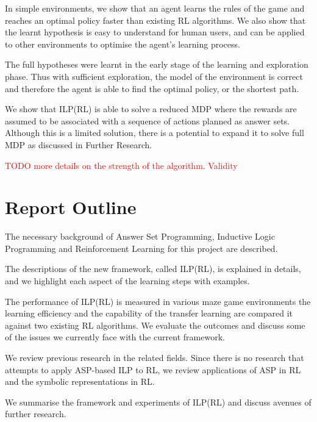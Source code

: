 In simple environments, we show that an agent learns the rules of the game and reaches an optimal policy faster than existing RL algorithms.
We also show that the learnt hypothesis is easy to understand for human users, and can be applied to other environments to optimise the agent's learning process.

The full hypotheses were learnt in the early stage of the learning and exploration phase. Thus with sufficient exploration, the model of the environment is correct
and therefore the agent is able to find the optimal policy, or the shortest path. 

We show that ILP(RL) is able to solve a reduced MDP where the rewards are assumed to be associated with a sequence of actions planned as answer sets.
Although this is a limited solution, there is a potential to expand it to solve full MDP as discussed in Further Research. 

\textcolor{red}{TODO more details on the strength of the algorithm. Validity}

\section{Report Outline}
\begin{customthm}{2}
The necessary background of Answer Set Programming, Inductive Logic Programming and Reinforcement Learning for this project are described.
\end{customthm}

\begin{customthm}{3}
The descriptions of the new framework, called ILP(RL), is explained in details, and we highlight each aspect of the learning steps with examples. 
\end{customthm}

\begin{customthm}{4}
The performance of ILP(RL) is measured in various maze game environments the learning efficiency and the capability of the transfer learning are compared it against two existing RL algorithms.
We evaluate the outcomes and discuss some of the issues we currently face with the current framework.
\end{customthm}

\begin{customthm}{5}
We review previous research in the related fields. Since there is no research that attempts to apply ASP-based ILP to RL, we review  
applications of ASP in RL and the symbolic representations in RL.  
\end{customthm}

\begin{customthm}{6}
We summarise the framework and experiments of ILP(RL) and discuss avenues of further research. 
\end{customthm}